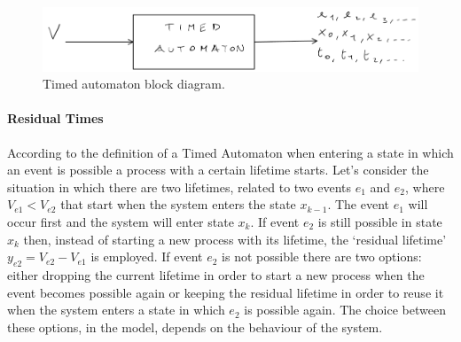 \documentclass[12pt,a4paper]{article}
\begin{document}
\begin{figure}[H]
	\centering
	\includegraphics[width=\textwidth]{IMG/timedAut.png}
	\caption{Timed automaton block diagram.}
	\label{fig:timedAut}
\end{figure}

\paragraph{Residual Times} According to the definition of a Timed Automaton when entering a state in which an event is possible a process with a certain lifetime starts. Let’s consider the situation in which there are two lifetimes, related to two events $e_1$ and $e_2$, where $V_{e1}<V_{e2}$ that start when the system enters the state $x_{k-1}$. The event $e_1$ will occur first and the system will enter state $x_k$. If event $e_2$ is still possible in state $x_k$ then, instead of starting a new process with its lifetime, the `residual lifetime’ $y_{e2}=V_{e2}-V_{e1}$ is employed. If event $e_2$ is not possible there are two options: either dropping the current lifetime in order to start a new process when the event becomes possible again or keeping the residual lifetime in order to reuse it when the system enters a state in which $e_2$ is possible again. The choice between these options, in the model, depends on the behaviour of the system.
\end{document}
